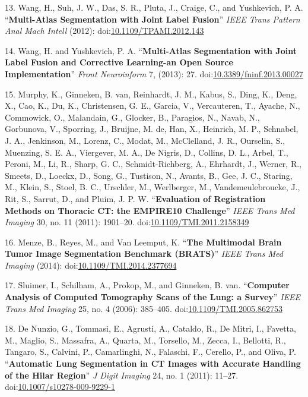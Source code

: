 \documentclass[11pt,]{article}
\begin{document}
13. Wang, H., Suh, J. W., Das, S. R., Pluta, J., Craige, C., and
Yushkevich, P. A. ``\textbf{Multi-Atlas Segmentation with Joint Label
Fusion}'' \emph{IEEE Trans Pattern Anal Mach Intell} (2012):
doi:\href{http://dx.doi.org/10.1109/TPAMI.2012.143}{10.1109/TPAMI.2012.143}

14. Wang, H. and Yushkevich, P. A. ``\textbf{Multi-Atlas Segmentation
with Joint Label Fusion and Corrective Learning-an Open Source
Implementation}'' \emph{Front Neuroinform} 7, (2013): 27.
doi:\href{http://dx.doi.org/10.3389/fninf.2013.00027}{10.3389/fninf.2013.00027}

15. Murphy, K., Ginneken, B. van, Reinhardt, J. M., Kabus, S., Ding, K.,
Deng, X., Cao, K., Du, K., Christensen, G. E., Garcia, V., Vercauteren,
T., Ayache, N., Commowick, O., Malandain, G., Glocker, B., Paragios, N.,
Navab, N., Gorbunova, V., Sporring, J., Bruijne, M. de, Han, X.,
Heinrich, M. P., Schnabel, J. A., Jenkinson, M., Lorenz, C., Modat, M.,
McClelland, J. R., Ourselin, S., Muenzing, S. E. A., Viergever, M. A.,
De Nigris, D., Collins, D. L., Arbel, T., Peroni, M., Li, R., Sharp, G.
C., Schmidt-Richberg, A., Ehrhardt, J., Werner, R., Smeets, D., Loeckx,
D., Song, G., Tustison, N., Avants, B., Gee, J. C., Staring, M., Klein,
S., Stoel, B. C., Urschler, M., Werlberger, M., Vandemeulebroucke, J.,
Rit, S., Sarrut, D., and Pluim, J. P. W. ``\textbf{Evaluation of
Registration Methods on Thoracic CT: the EMPIRE10 Challenge}''
\emph{IEEE Trans Med Imaging} 30, no. 11 (2011): 1901--20.
doi:\href{http://dx.doi.org/10.1109/TMI.2011.2158349}{10.1109/TMI.2011.2158349}

16. Menze, B., Reyes, M., and Van Leemput, K. ``\textbf{The Multimodal
Brain Tumor Image Segmentation Benchmark (BRATS)}'' \emph{IEEE Trans Med
Imaging} (2014):
doi:\href{http://dx.doi.org/10.1109/TMI.2014.2377694}{10.1109/TMI.2014.2377694}

17. Sluimer, I., Schilham, A., Prokop, M., and Ginneken, B. van.
``\textbf{Computer Analysis of Computed Tomography Scans of the Lung: a
Survey}'' \emph{IEEE Trans Med Imaging} 25, no. 4 (2006): 385--405.
doi:\href{http://dx.doi.org/10.1109/TMI.2005.862753}{10.1109/TMI.2005.862753}

18. De Nunzio, G., Tommasi, E., Agrusti, A., Cataldo, R., De Mitri, I.,
Favetta, M., Maglio, S., Massafra, A., Quarta, M., Torsello, M., Zecca,
I., Bellotti, R., Tangaro, S., Calvini, P., Camarlinghi, N., Falaschi,
F., Cerello, P., and Oliva, P. ``\textbf{Automatic Lung Segmentation in
CT Images with Accurate Handling of the Hilar Region}'' \emph{J Digit
Imaging} 24, no. 1 (2011): 11--27.
doi:\href{http://dx.doi.org/10.1007/s10278-009-9229-1}{10.1007/s10278-009-9229-1}
\end{document}

